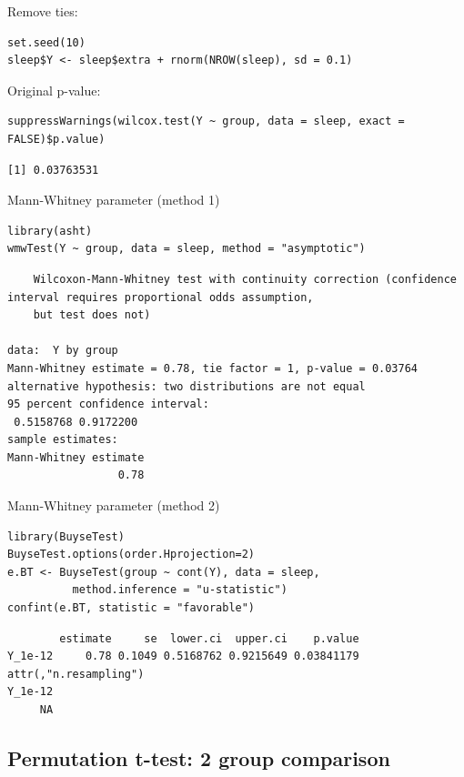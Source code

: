 \documentclass{article}
\begin{document}
Remove ties:
\lstset{language=r,label= ,caption= ,captionpos=b,numbers=none}
\begin{lstlisting}
set.seed(10)
sleep$Y <- sleep$extra + rnorm(NROW(sleep), sd = 0.1)
\end{lstlisting}

Original p-value:
\lstset{language=r,label= ,caption= ,captionpos=b,numbers=none}
\begin{lstlisting}
suppressWarnings(wilcox.test(Y ~ group, data = sleep, exact = FALSE)$p.value)
\end{lstlisting}

\begin{verbatim}
[1] 0.03763531
\end{verbatim}

Mann-Whitney parameter (method 1)
\lstset{language=r,label= ,caption= ,captionpos=b,numbers=none}
\begin{lstlisting}
library(asht)
wmwTest(Y ~ group, data = sleep, method = "asymptotic")
\end{lstlisting}

\begin{verbatim}
	Wilcoxon-Mann-Whitney test with continuity correction (confidence interval requires proportional odds assumption,
	but test does not)

data:  Y by group
Mann-Whitney estimate = 0.78, tie factor = 1, p-value = 0.03764
alternative hypothesis: two distributions are not equal
95 percent confidence interval:
 0.5158768 0.9172200
sample estimates:
Mann-Whitney estimate 
                 0.78
\end{verbatim}

Mann-Whitney parameter (method 2)
\lstset{language=r,label= ,caption= ,captionpos=b,numbers=none}
\begin{lstlisting}
library(BuyseTest)
BuyseTest.options(order.Hprojection=2)
e.BT <- BuyseTest(group ~ cont(Y), data = sleep, 
		  method.inference = "u-statistic")
confint(e.BT, statistic = "favorable")
\end{lstlisting}

\begin{verbatim}
        estimate     se  lower.ci  upper.ci    p.value
Y_1e-12     0.78 0.1049 0.5168762 0.9215649 0.03841179
attr(,"n.resampling")
Y_1e-12 
     NA
\end{verbatim}

\subsection{Permutation t-test: 2 group comparison}
\label{sec:orgd2bf2e0}
\end{document}
